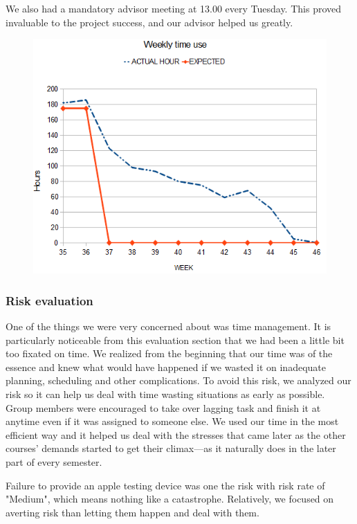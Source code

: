   We also had a mandatory advisor meeting at 13.00 every Tuesday. This proved
  invaluable to the project success, and our advisor helped us greatly. 
 	
    \begin{figure}[htb]
        \centering
        \includegraphics[scale=0.88]{timebudget.png}
        \label{fig:time}
    \end{figure}
 \subsubsection{Risk evaluation} 
 One of the things we were very concerned about was time management. It is particularly noticeable from this evaluation section that we had been a little bit too fixated on time. We realized from the beginning that our time was of the essence and knew what would have happened if we wasted it on inadequate planning, scheduling and other complications. To avoid this risk, we analyzed our risk so it can help us deal with time wasting situations as early as possible. Group members were encouraged to take over lagging task and finish it at anytime even if it was assigned to someone else. We used our time in the most efficient way and it helped us deal with the stresses that came later as the other courses' demands started to get their climax---as it naturally does in the later part of every semester. 
 
 Failure to provide an apple testing device was one the risk with risk rate of "Medium", which means nothing like a catastrophe. Relatively, we focused on averting risk than letting them happen and deal with them.
	
